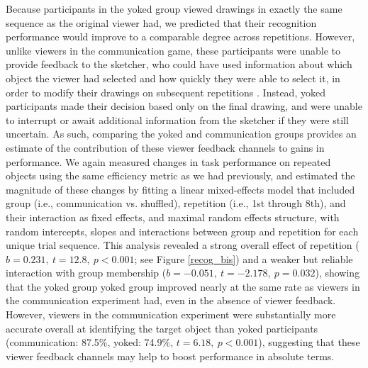\documentclass[10pt,letterpaper]{article}
\begin{document}
Because participants in the yoked group viewed drawings in exactly the same sequence as the original viewer had, we predicted that their recognition performance would improve to a comparable degree across repetitions. 
However, unlike viewers in the communication game, these participants were unable to provide feedback to the sketcher, who could have used information about which object the viewer had selected and how quickly they were able to select it, in order to modify their drawings on subsequent repetitions \cite{schober_understanding_1989}. 
Instead, yoked participants made their decision based only on the final drawing, and were unable to interrupt or await additional information from the sketcher if they were still uncertain.
As such, comparing the yoked and communication groups provides an estimate of the contribution of these viewer feedback channels to gains in performance. 
We again measured changes in task performance on repeated objects using the same efficiency metric as we had previously, and estimated the magnitude of these changes by fitting a linear mixed-effects model that included group (i.e., communication vs. shuffled), repetition (i.e., 1st through 8th), and their interaction as fixed effects, and maximal random effects structure, with random intercepts, slopes and interactions between group and repetition for each unique trial sequence. 
This analysis revealed a strong overall effect of repetition ($b = 0.231, ~t = 12.8,~p < 0.001$; see Figure \ref{recog_bis}) and a weaker but reliable interaction with group membership ($b = -0.051, ~t = -2.178, ~p = 0.032$), showing that the yoked group yoked group improved nearly at the same rate as viewers in the communication experiment had, even in the absence of viewer feedback. %
However, viewers in the communication experiment were substantially more accurate overall at identifying the target object than yoked participants (communication: 87.5\%, yoked: 74.9\%, $t = 6.18, ~p < 0.001$), suggesting that these viewer feedback channels may help to boost performance in absolute terms. %


\end{document}
